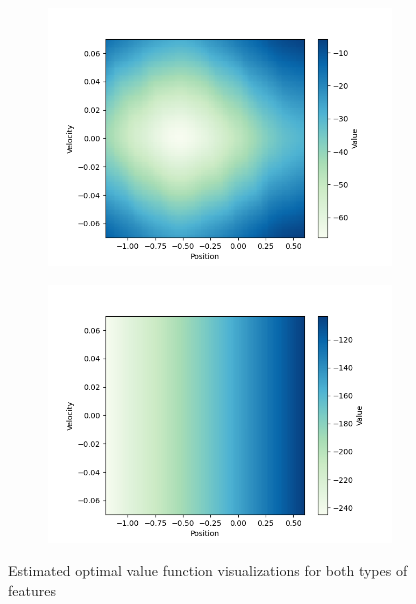 \documentclass[11pt,addpoints,answers]{exam}
\begin{document}
\begin{questions}
\begin{parts}
    \begin{your_solution}[title=Plot of Tile, height=10cm]
    \end{your_solution}
    
    \begin{your_solution}[title=Comment,height=5cm]
    \end{your_solution}
    \clearpage
    \begin{figure}[H]
        \centering
        \begin{subfigure}{0.5\textwidth}
            \hspace{2em}\includegraphics[width=0.8\linewidth]{figs/value_A.png}
            \caption{}
            \label{fig:value_a}
        \end{subfigure}%
        \begin{subfigure}{0.5\textwidth}
            \hspace{2em}\includegraphics[width=0.8\linewidth]{figs/value_B.png}
            \caption{}
            \label{fig:value_b}
        \end{subfigure}
        \caption{Estimated optimal value function visualizations for both types of features}
        \label{fig:value}
    \end{figure}
    

\end{parts}
\end{questions}
\end{document}
